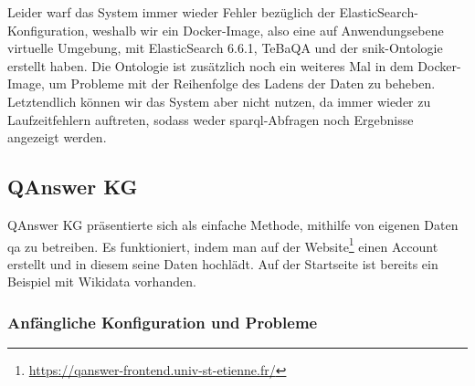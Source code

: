 Leider warf das System immer wieder Fehler bezüglich der ElasticSearch-Konfiguration, weshalb wir ein Docker-Image,
also eine auf Anwendungsebene virtuelle Umgebung, mit ElasticSearch 6.6.1, TeBaQA und der \ac{snik}-Ontologie erstellt haben.
Die Ontologie ist zusätzlich noch ein weiteres Mal in dem Docker-Image, um Probleme mit der Reihenfolge des Ladens der Daten zu beheben.
Letztendlich können wir das System aber nicht nutzen, da immer wieder zu Laufzeitfehlern auftreten,
sodass weder \ac{sparql}-Abfragen noch Ergebnisse angezeigt werden.

\subsection{QAnswer KG}

QAnswer KG präsentierte sich als einfache Methode, mithilfe von eigenen Daten \acl{qa} zu betreiben.
Es funktioniert, indem man auf der Website\footnote{\url{https://qanswer-frontend.univ-st-etienne.fr/}} einen Account erstellt und in diesem seine Daten hochlädt.
Auf der Startseite ist bereits ein Beispiel mit Wikidata vorhanden.

\subsubsection{Anfängliche Konfiguration und Probleme}

